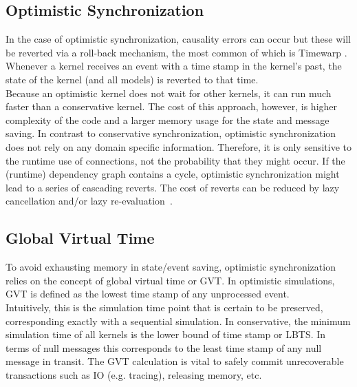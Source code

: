 \subsection{Optimistic Synchronization}
In the case of optimistic synchronization, causality errors can occur but these will be reverted via a roll-back mechanism, the most common of which is Timewarp \cite{Jefferson:1985:VT:3916.3988}.\\
Whenever a kernel receives an event with a time stamp in the kernel's past, the state of the kernel (and all models) is reverted to that time.\\
Because an optimistic kernel does not wait for other kernels, it can run much faster than a conservative kernel.
The cost of this approach, however, is higher complexity of the code and a larger memory usage for the state and message saving.
In contrast to conservative synchronization, optimistic synchronization does not rely on any domain specific information. Therefore, it is only sensitive to the runtime use of connections, not the probability that they might occur. %
If the (runtime) dependency graph contains a cycle, optimistic synchronization might lead to a series of cascading reverts. The cost of reverts can be reduced by lazy cancellation and/or lazy re-evaluation~\cite{FujimotoBook}.

\subsection{Global Virtual Time}
To avoid exhausting memory in state/event saving, optimistic synchronization relies on the concept of global virtual time\cite{Jefferson:1985:VT:3916.3988} or GVT. In optimistic simulations, GVT is defined as the lowest time stamp of any unprocessed event.\\
Intuitively, this is the simulation time point that is certain to be preserved, corresponding exactly with a sequential simulation.
In conservative, the minimum simulation time of all kernels is the lower bound of time stamp or LBTS. In terms of null messages this corresponds to the least time stamp of any null message in transit.
The GVT calculation is vital to safely commit unrecoverable transactions such as IO (e.g. tracing), releasing memory, etc.

